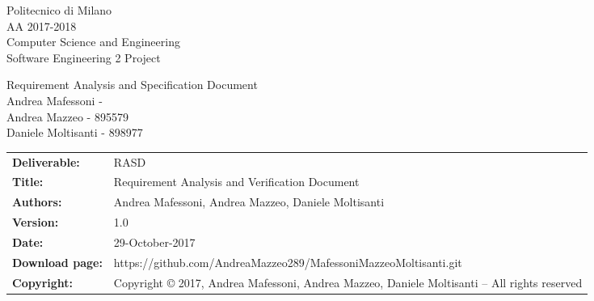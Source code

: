 
\usepackage{graphicx}
\usepackage{listings}
\renewcommand\textfraction{.1}
\usepackage{booktabs}

	
	
	\begin{titlepage}
		
		\begin{figure}[t]
			\centering
		\end{figure}
		\begin{center}
			Politecnico di Milano\\AA 2017-2018\\
			\vspace{7mm}
			Computer Science and Engineering\\
			\huge Software Engineering 2 Project
		\end{center}
	
		\begin{figure}[!h]
		\centering
		\end{figure}
		
		\begin{center}
			\fontsize{7mm}{10mm}\selectfont Requirement Analysis and Specification Document \\
			\vspace{7mm}
			\small Andrea Mafessoni - \\
			Andrea Mazzeo - 895579\\
			Daniele Moltisanti - 898977
		\end{center}
	
	\end{titlepage}
	
	\begin{table}[h!]
		\begin{tabu} to \textwidth { X[0.3,r,p] X[0.7,l,p] }
			\hline
			
			\textbf{Deliverable:} & RASD\\
			\textbf{Title:} & Requirement Analysis and Verification Document \\
			\textbf{Authors:} & Andrea Mafessoni, Andrea Mazzeo, Daniele Moltisanti \\
			\textbf{Version:} & 1.0 \\ 
			\textbf{Date:} & 29-October-2017 \\
			\textbf{Download page:} & https://github.com/AndreaMazzeo289/MafessoniMazzeoMoltisanti.git \\
			\textbf{Copyright:} & Copyright © 2017, Andrea Mafessoni, Andrea Mazzeo, Daniele Moltisanti – All rights reserved \\
			\hline
		\end{tabu}
	\end{table}
	
